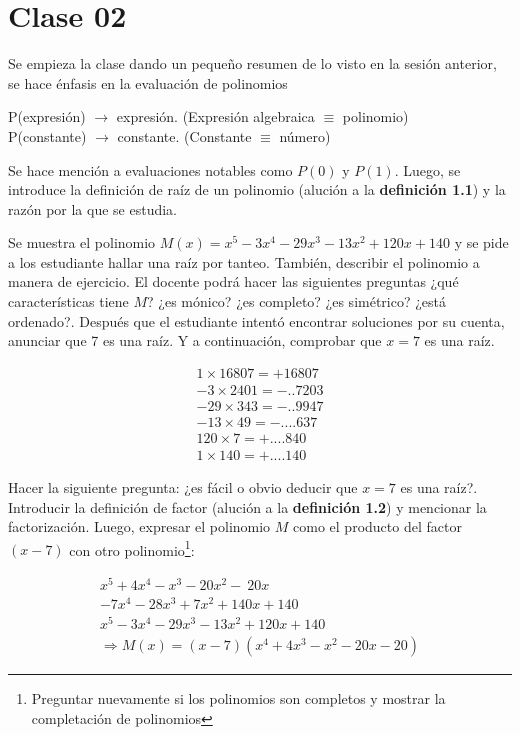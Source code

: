 \section{Clase 02}

Se empieza la clase dando un pequeño resumen de lo visto en la sesión anterior, se hace énfasis en la evaluación de polinomios
\begin{center}
    P(expresión) $\rightarrow$ expresión. (Expresión algebraica $\equiv$ polinomio)\\
    P(constante) $\rightarrow$ constante. (Constante $\equiv$ número)
\end{center}
Se hace mención a evaluaciones notables como $P(0)$ y $P(1)$.
Luego, se introduce la definición de raíz de un polinomio (alución a la \textbf{definición 1.1}) y la razón por la que se estudia.

Se muestra el polinomio $M(x) = x^5 - 3x^4 - 29x^3 - 13x^2 + 120x + 140$ y se pide a los estudiante hallar una raíz por tanteo.
También, describir el polinomio a manera de ejercicio.
El docente podrá hacer las siguientes preguntas ¿qué características tiene $M$? ¿es mónico? ¿es completo? ¿es simétrico? ¿está ordenado?.
Después que el estudiante intentó encontrar soluciones por su cuenta, anunciar que 7 es una raíz.
Y a continuación, comprobar que $x = 7$ es una raíz.

\begin{align*}
    1\times 16807= +16807\\
    -3\times 2401 = -\mbox{..}7203\\
    -29\times 343  = -\mbox{..}9947\\
    -13\times 49   = -\mbox{....}637\\
    120\times 7    = +\mbox{....}840\\
    1\times 140  = +\mbox{....}140
\end{align*}

Hacer la siguiente pregunta: ¿es fácil o obvio deducir que $x = 7$ es una raíz?.
Introducir la definición de factor (alución a la \textbf{definición 1.2}) y mencionar la factorización.
Luego, expresar el polinomio $M$ como el producto del factor $(x - 7)$ con otro polinomio\footnote{Preguntar nuevamente si los polinomios son completos y mostrar la completación de polinomios}:

\begin{align*}
    x^5 + 4x^4 - x^3 - 20x^2 - \:20x \hspace{3em}\\
    - 7x^4 - 28x^3 + 7x^2 + 140x + 140\\
    x^5 - 3x^4 - 29x^3 - 13x^2 + 120x + 140\\
    \Rightarrow M(x) = (x - 7)(x^4 + 4x^3 - x^2 - 20x - 20)
\end{align*}

